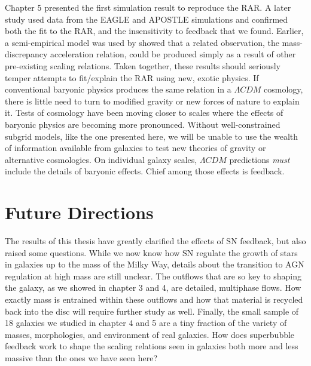Chapter 5 presented the first simulation result to reproduce the
\citet{McGaugh2016} RAR.  A later study \citep{Ludlow2016} used data from the
EAGLE \citep{Schaye2015} and APOSTLE \citep{Sawala2016} simulations and
confirmed both the fit to the RAR, and the insensitivity to feedback that we
found.  Earlier, a semi-empirical model was used by \citet{DiCintio2016} showed
that a related observation, the mass-discrepancy acceleration relation, could be
produced simply as a result of other pre-existing scaling relations.  Taken
together, these results should seriously temper attempts to fit/explain the RAR
using new, exotic physics.  If conventional baryonic physics produces the same
relation in a $\Lambda CDM$ cosmology, there is little need to turn to modified
gravity \citep{Moffat2016,Verlinde2016} or new forces of nature
\citep{Burrage2016} to explain it.  Tests of cosmology have been moving closer
to scales where the effects of baryonic physics are becoming more pronounced.
Without well-constrained subgrid models, like the one presented here, we will be
unable to use the wealth of information available from galaxies to test new
theories of gravity or alternative cosmologies.  On individual galaxy scales,
$\Lambda CDM$ predictions {\it must} include the details of baryonic effects.
Chief among those effects is feedback.

\section{Future Directions}
The results of this thesis have greatly clarified the effects of SN feedback,
but also raised some questions.  While we now know how SN regulate the growth of
stars in galaxies up to the mass of the Milky Way, details about the transition
to AGN regulation at high mass are still unclear.  The outflows that are so key
to shaping the galaxy, as we showed in chapter 3 and 4, are detailed, multiphase
flows.  How exactly mass is entrained within these outflows and how that
material is recycled back into the disc will require further study as well.
Finally, the small sample of 18 galaxies we studied in chapter 4 and 5 are a
tiny fraction of the variety of masses, morphologies, and environment of real
galaxies.  How does superbubble feedback work to shape the scaling relations
seen in galaxies both more and less massive than the ones we have seen here?

